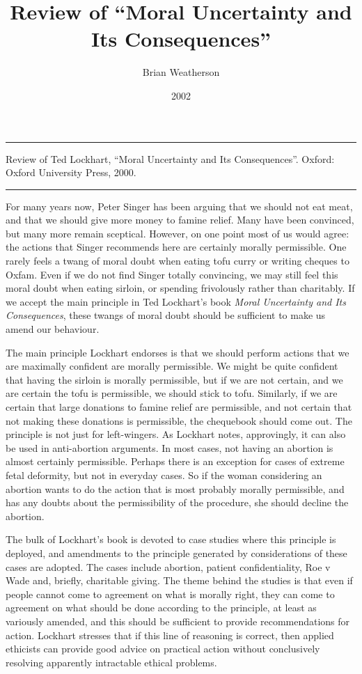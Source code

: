 \documentclass[
  10pt,
  letterpaper,
  DIV=11,
  numbers=noendperiod,
  twoside]{scrartcl}
\title{Review of ``Moral Uncertainty and Its Consequences''}
\author{Brian Weatherson}
\date{2002}
\renewenvironment{abstract}
 {\vspace{-1.25cm}
 \quotation\small\noindent\rule{\linewidth}{.5pt}\par\smallskip
 \noindent }
 {\par\noindent\rule{\linewidth}{.5pt}\endquotation}
\begin{document}
\maketitle
\begin{abstract}
Review of Ted Lockhart, ``Moral Uncertainty and Its Consequences''.
Oxford: Oxford University Press, 2000.
\end{abstract}

For many years now, Peter Singer has been arguing that we should not eat
meat, and that we should give more money to famine relief. Many have
been convinced, but many more remain sceptical. However, on one point
most of us would agree: the actions that Singer recommends here are
certainly morally permissible. One rarely feels a twang of moral doubt
when eating tofu curry or writing cheques to Oxfam. Even if we do not
find Singer totally convincing, we may still feel this moral doubt when
eating sirloin, or spending frivolously rather than charitably. If we
accept the main principle in Ted Lockhart's book \emph{Moral Uncertainty
and Its Consequences}, these twangs of moral doubt should be sufficient
to make us amend our behaviour.

The main principle Lockhart endorses is that we should perform actions
that we are maximally confident are morally permissible. We might be
quite confident that having the sirloin is morally permissible, but if
we are not certain, and we are certain the tofu is permissible, we
should stick to tofu. Similarly, if we are certain that large donations
to famine relief are permissible, and not certain that not making these
donations is permissible, the chequebook should come out. The principle
is not just for left-wingers. As Lockhart notes, approvingly, it can
also be used in anti-abortion arguments. In most cases, not having an
abortion is almost certainly permissible. Perhaps there is an exception
for cases of extreme fetal deformity, but not in everyday cases. So if
the woman considering an abortion wants to do the action that is most
probably morally permissible, and has any doubts about the
permissibility of the procedure, she should decline the abortion.

The bulk of Lockhart's book is devoted to case studies where this
principle is deployed, and amendments to the principle generated by
considerations of these cases are adopted. The cases include abortion,
patient confidentiality, Roe v Wade and, briefly, charitable giving. The
theme behind the studies is that even if people cannot come to agreement
on what is morally right, they can come to agreement on what should be
done according to the principle, at least as variously amended, and this
should be sufficient to provide recommendations for action. Lockhart
stresses that if this line of reasoning is correct, then applied
ethicists can provide good advice on practical action without
conclusively resolving apparently intractable ethical problems.
\end{document}
